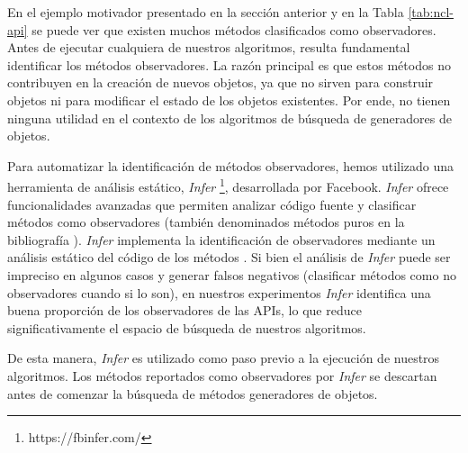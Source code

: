 En el ejemplo motivador presentado en la sección anterior y en la Tabla \ref{tab:ncl-api} se puede ver que existen muchos métodos clasificados como observadores. 
Antes de ejecutar cualquiera de nuestros algoritmos, resulta fundamental identificar los métodos observadores. La razón principal es que estos métodos no contribuyen en la creación de nuevos objetos, ya que no sirven para construir objetos ni para modificar el estado de los objetos existentes. Por ende, no tienen ninguna utilidad en el contexto de los algoritmos de búsqueda de generadores de objetos.

Para automatizar la identificación de métodos observadores, hemos utilizado una herramienta de análisis estático, \emph{Infer} \footnote{https://fbinfer.com/}, 
desarrollada por Facebook. \emph{Infer} ofrece funcionalidades avanzadas que permiten analizar código fuente y clasificar métodos como observadores \cite{Huang:2012} (también denominados métodos puros en la bibliografía \cite{Huang:2012}).
\emph{Infer} implementa la identificación de observadores mediante un análisis estático del código de los métodos \cite{Huang:2012,Salcianu:2005}. 
Si bien el análisis de \emph{Infer} puede ser impreciso en algunos casos y generar falsos negativos (clasificar métodos como no observadores cuando si lo son), 
en nuestros experimentos \emph{Infer}  identifica una buena proporción de los observadores de las APIs, lo que reduce significativamente el espacio de búsqueda de nuestros algoritmos.






De esta manera, \emph{Infer} es utilizado como paso previo a la ejecución de nuestros algoritmos. Los métodos reportados como observadores por \emph{Infer} se descartan antes de comenzar la búsqueda de métodos generadores de objetos.


